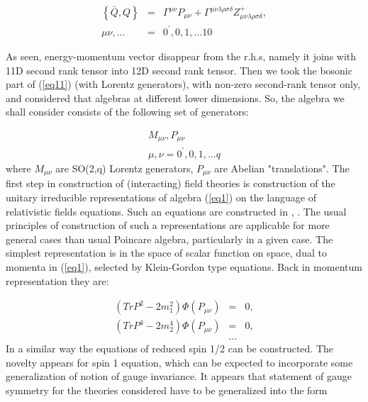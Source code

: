 \documentclass[a4paper,12pt]{article}
\begin{document}
\begin{eqnarray}
\left\{ \bar{Q},Q\right\} &=& \Gamma ^{\mu \nu }P_{\mu \nu
}+\Gamma
 ^{\mu \nu \lambda \rho \sigma \delta }Z_{\mu \nu
\lambda \rho \sigma \delta }^{+},
\label{eq11} \\
\mu \nu ,... &=&0^{\prime },0,1,...10 \nonumber
\end{eqnarray}

As seen, energy-momentum vector disappear from the r.h.s, namely
it joins with 11D second rank tensor into 12D second rank tensor.
Then we took the bosonic part of (\ref{eq11}) (with Lorentz
generators), with non-zero second-rank tensor only, and considered
that algebras at different lower dimensions. So, the algebra we
shall consider consists of the following set of generators:

\begin{eqnarray}
M_{\mu \nu}, P_{\mu \nu} \label{eq111} \\ \mu, \nu=0^{\prime },
0,1,...q \nonumber
\end{eqnarray}
where $M_{\mu \nu}$ are SO(2,q) Lorentz generators, $P_{\mu \nu}$
are Abelian "translations". The first step in construction of
(interacting) field theories is construction of the unitary
irreducible representations of algebra (\ref{eq1}) on the language
of relativistic fields equations. Such an equations are
constructed in \cite{Man1}, \cite{Man2}. The usual principles of
construction of such a representations are applicable for more
general cases than usual Poincare algebra, particularly in a given
case. The simplest representation is in the space of scalar
function on space, dual to momenta in (\ref{eq1}), selected by
Klein-Gordon type equations. Back in momentum representation they
are:

\begin{eqnarray}
(TrP^{2}-2m_{1}^{2})\Phi (P_{\mu \nu }) &=&0,  \label{eq2} \\
(TrP^{4}-2m_{2}^{4})\Phi (P_{\mu \nu }) &=&0,   \label{eq22}\\
&...&  \nonumber
\end{eqnarray}
In a similar way the equations of  reduced spin 1/2 can be
constructed. The novelty appears for spin 1 equation, which can be
expected to incorporate some generalization of notion of gauge
invariance. It appears that statement of gauge symmetry for the
theories considered have to be generalized into the form
\end{document}
